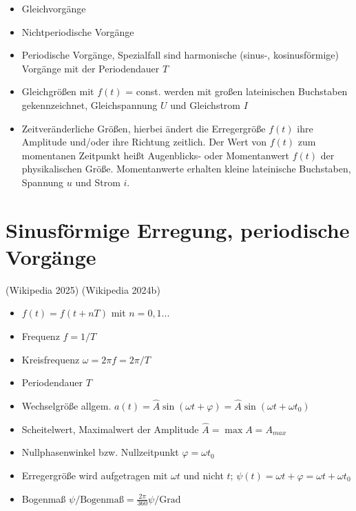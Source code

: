\documentclass[
  ngerman,
  letterpaper,
]{scrbook}
\begin{document}
\begin{itemize}
\item
  Gleichvorgänge
\item
  Nichtperiodische Vorgänge
\item
  Periodische Vorgänge, Spezialfall sind harmonische (sinus-,
  kosinusförmige) Vorgänge mit der Periodendauer \(T\)
\item
  Gleichgrößen mit \(f(t)\) = const. werden mit großen lateinischen
  Buchstaben gekennzeichnet, Gleichspannung \(U\) und Gleichstrom \(I\)
\item
  Zeitveränderliche Größen, hierbei ändert die Erregergröße \(f(t)\)
  ihre Amplitude und/oder ihre Richtung zeitlich. Der Wert von \(f(t)\)
  zum momentanen Zeitpunkt heißt Augenblicks- oder Momentanwert \(f(t)\)
  der physikalischen Größe. Momentanwerte erhalten kleine lateinische
  Buchstaben, Spannung \(u\) und Strom \(i\).
\end{itemize}

\section{Sinusförmige Erregung, periodische
Vorgänge}\label{sinusfuxf6rmige-erregung-periodische-vorguxe4nge}

(Wikipedia 2025) (Wikipedia 2024b)

\begin{tcolorbox}[enhanced jigsaw, titlerule=0mm, rightrule=.15mm, toprule=.15mm, colback=white, toptitle=1mm, bottomrule=.15mm, coltitle=black, leftrule=.75mm, arc=.35mm, colbacktitle=quarto-callout-note-color!10!white, opacityback=0, bottomtitle=1mm, colframe=quarto-callout-note-color-frame, opacitybacktitle=0.6, breakable, title=\textcolor{quarto-callout-note-color}{\faInfo}\hspace{0.5em}{Definitionen}, left=2mm]

\begin{itemize}
\item
  \(f(t)=f(t+nT)\) mit \(n=0, 1 ...\)
\item
  Frequenz \(f=1/T\)
\item
  Kreisfrequenz \(\omega=2\pi f = 2\pi/T\)
\item
  Periodendauer \(T\)
\item
  Wechselgröße allgem.
  \(a(t)=\hat{A} \sin (\omega t +\varphi) = \hat{A} \sin(\omega t + \omega t_0)\)
\item
  Scheitelwert, Maximalwert der Amplitude \(\hat{A}=\max{A}=A_{max}\)
\item
  Nullphasenwinkel bzw. Nullzeitpunkt \(\varphi=\omega t_0\)
\item
  Erregergröße wird aufgetragen mit \(\omega t\) und nicht \(t\);
  \(\psi(t) = \omega t + \varphi = \omega t + \omega t_0\)
\item
  Bogenmaß \(\psi/\mbox{Bogenmaß} = \frac{2 \pi}{360} \psi/\mbox{Grad}\)
\end{itemize}

\end{tcolorbox}
\end{document}
